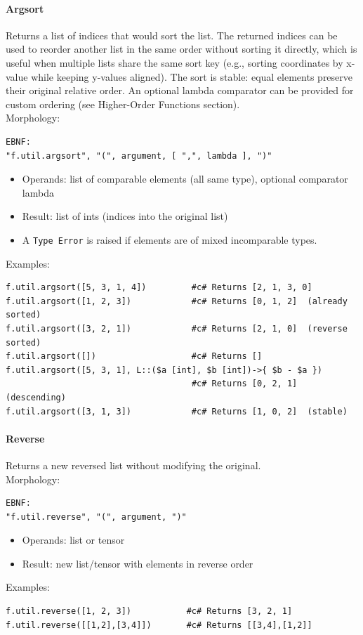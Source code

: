 \paragraph{Argsort}
Returns a list of indices that would sort the list. The returned indices can be used to reorder another list in the same order without sorting it directly, which is useful when multiple lists share the same sort key (e.g., sorting coordinates by x-value while keeping y-values aligned). The sort is stable: equal elements preserve their original relative order. An optional lambda comparator can be provided for custom ordering (see Higher-Order Functions section).\\
Morphology:
\begin{verbatim}
EBNF:
"f.util.argsort", "(", argument, [ ",", lambda ], ")"
\end{verbatim}
\begin{itemize}
\item Operands: list of comparable elements (all same type), optional comparator lambda
\item Result: list of ints (indices into the original list)
\item A \texttt{Type Error} is raised if elements are of mixed incomparable types.
\end{itemize}
Examples:
\begin{verbatim}
f.util.argsort([5, 3, 1, 4])         #c# Returns [2, 1, 3, 0]
f.util.argsort([1, 2, 3])            #c# Returns [0, 1, 2]  (already sorted)
f.util.argsort([3, 2, 1])            #c# Returns [2, 1, 0]  (reverse sorted)
f.util.argsort([])                   #c# Returns []
f.util.argsort([5, 3, 1], L::($a [int], $b [int])->{ $b - $a })
                                     #c# Returns [0, 2, 1]  (descending)
f.util.argsort([3, 1, 3])            #c# Returns [1, 0, 2]  (stable)
\end{verbatim}

\paragraph{Reverse}
Returns a new reversed list without modifying the original.\\
Morphology:
\begin{verbatim}
EBNF:
"f.util.reverse", "(", argument, ")"
\end{verbatim}
\begin{itemize}
\item Operands: list or tensor
\item Result: new list/tensor with elements in reverse order
\end{itemize}
Examples:
\begin{verbatim}
f.util.reverse([1, 2, 3])           #c# Returns [3, 2, 1]
f.util.reverse([[1,2],[3,4]])       #c# Returns [[3,4],[1,2]]
\end{verbatim}

